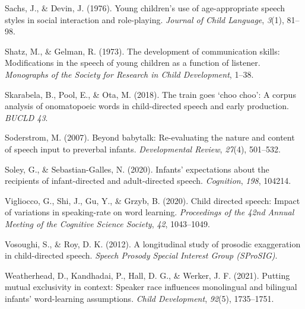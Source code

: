 \documentclass[10pt, letterpaper]{article}
\newenvironment{CSLReferences}%
  {}%
  {\par}
\begin{document}
\begin{CSLReferences}
\leavevmode\hypertarget{ref-sachs1976young}{}%
Sachs, J., \& Devin, J. (1976). Young children's use of age-appropriate
speech styles in social interaction and role-playing. \emph{Journal of
Child Language}, \emph{3}(1), 81--98.

\leavevmode\hypertarget{ref-shatz1973development}{}%
Shatz, M., \& Gelman, R. (1973). The development of communication
skills: Modifications in the speech of young children as a function of
listener. \emph{Monographs of the Society for Research in Child
Development}, 1--38.

\leavevmode\hypertarget{ref-skarabela2018train}{}%
Skarabela, B., Pool, E., \& Ota, M. (2018). The train goes {`choo
choo'}: A corpus analysis of onomatopoeic words in child-directed speech
and early production. \emph{BUCLD 43}.

\leavevmode\hypertarget{ref-soderstrom2007beyond}{}%
Soderstrom, M. (2007). Beyond babytalk: Re-evaluating the nature and
content of speech input to preverbal infants. \emph{Developmental
Review}, \emph{27}(4), 501--532.

\leavevmode\hypertarget{ref-soley2020infants}{}%
Soley, G., \& Sebastian-Galles, N. (2020). Infants' expectations about
the recipients of infant-directed and adult-directed speech.
\emph{Cognition}, \emph{198}, 104214.

\leavevmode\hypertarget{ref-vigliocco2020child}{}%
Vigliocco, G., Shi, J., Gu, Y., \& Grzyb, B. (2020). Child directed
speech: Impact of variations in speaking-rate on word learning.
\emph{Proceedings of the 42nd Annual Meeting of the Cognitive Science
Society}, \emph{42}, 1043--1049.

\leavevmode\hypertarget{ref-vosoughi2012longitudinal}{}%
Vosoughi, S., \& Roy, D. K. (2012). A longitudinal study of prosodic
exaggeration in child-directed speech. \emph{Speech Prosody Special
Interest Group (SProSIG)}.

\leavevmode\hypertarget{ref-weatherhead2021putting}{}%
Weatherhead, D., Kandhadai, P., Hall, D. G., \& Werker, J. F. (2021).
Putting mutual exclusivity in context: Speaker race influences
monolingual and bilingual infants' word-learning assumptions.
\emph{Child Development}, \emph{92}(5), 1735--1751.

\end{CSLReferences}


\end{document}

